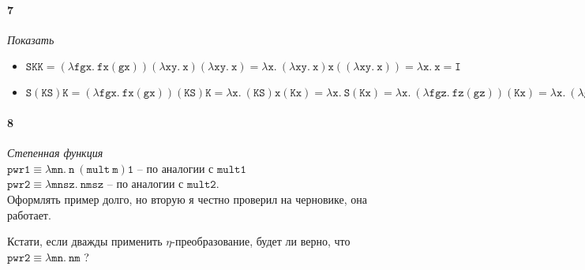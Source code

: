 \documentclass[russian]{article}
\begin{document}
\paragraph{7} \textit{Показать}

\begin{itemize}
\item $\mathtt{
	SKK = (\lambda fgx.\ fx(gx))(\lambda xy.\ x)(\lambda xy.\ x)
	= \lambda x.\ (\lambda xy.\ x)x((\lambda xy.\ x))
	= \lambda x.\ x = I
	}$

\item $\mathtt{
	S(KS)K = (\lambda fgx.\ fx(gx))(KS)K
	= \lambda x.\ (KS)x(Kx)
	= \lambda x.\ S(Kx)
	= \lambda x.\ (\lambda fgz.\ fz(gz))(Kx)
	= \lambda x.\ (\lambda gz.\ (Kxz)(gz))
	= \lambda xgz.\ x(gz)) = B
	}$

\end{itemize}

\paragraph{8} \textit{Степенная функция}\\

$\mathtt{pwr1 \equiv \lambda mn.\ n\ (mult\ m) 1}$ -- по аналогии с $\mathtt{mult1}$ \\

$\mathtt{pwr2 \equiv \lambda mnsz.\ nmsz}$ -- по аналогии с $\mathtt{mult2}$.\\

Оформлять пример долго, но вторую я честно проверил на черновике, она работает.

Кстати, если дважды применить $\eta$-преобразование, будет ли верно, что $\mathtt{pwr2 \equiv \lambda mn.\ nm}$ ?
\end{document}
